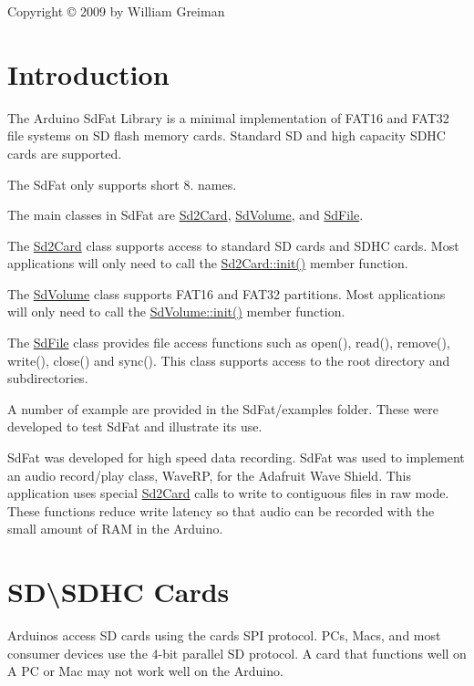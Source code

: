 \begin{center}Copyright \copyright{} 2009 by William Greiman \end{center} \hypertarget{index_Intro}{}\section{Introduction}\label{index_Intro}
The Arduino Sd\+Fat Library is a minimal implementation of F\+A\+T16 and F\+A\+T32 file systems on SD flash memory cards. Standard SD and high capacity S\+D\+HC cards are supported.

The Sd\+Fat only supports short 8. names.

The main classes in Sd\+Fat are \hyperlink{class_sd2_card}{Sd2\+Card}, \hyperlink{class_sd_volume}{Sd\+Volume}, and \hyperlink{class_sd_file}{Sd\+File}.

The \hyperlink{class_sd2_card}{Sd2\+Card} class supports access to standard SD cards and S\+D\+HC cards. Most applications will only need to call the \hyperlink{class_sd2_card_afaec9a22060626b02c07a09eff2e9113}{Sd2\+Card\+::init()} member function.

The \hyperlink{class_sd_volume}{Sd\+Volume} class supports F\+A\+T16 and F\+A\+T32 partitions. Most applications will only need to call the \hyperlink{class_sd_volume_adfcf83cba537b831f3a993a058e7ca85}{Sd\+Volume\+::init()} member function.

The \hyperlink{class_sd_file}{Sd\+File} class provides file access functions such as open(), read(), remove(), write(), close() and sync(). This class supports access to the root directory and subdirectories.

A number of example are provided in the Sd\+Fat/examples folder. These were developed to test Sd\+Fat and illustrate its use.

Sd\+Fat was developed for high speed data recording. Sd\+Fat was used to implement an audio record/play class, Wave\+RP, for the Adafruit Wave Shield. This application uses special \hyperlink{class_sd2_card}{Sd2\+Card} calls to write to contiguous files in raw mode. These functions reduce write latency so that audio can be recorded with the small amount of R\+AM in the Arduino.\hypertarget{index_SDcard}{}\section{S\+D\textbackslash{}\+S\+D\+H\+C Cards}\label{index_SDcard}
Arduinos access SD cards using the cards S\+PI protocol. P\+Cs, Macs, and most consumer devices use the 4-\/bit parallel SD protocol. A card that functions well on A PC or Mac may not work well on the Arduino.

